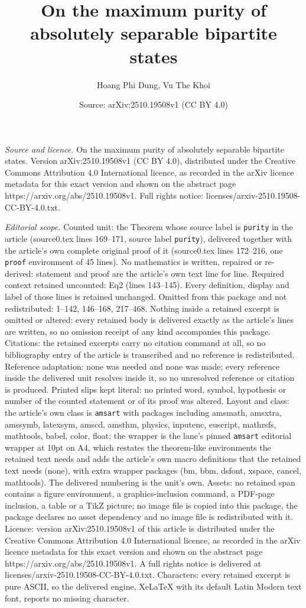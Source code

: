 \documentclass[10pt,a4paper]{amsart}
\title[On the maximum purity of absolutely separable bipartite stat]{On the maximum purity of absolutely separable bipartite states}
\author{Hoang Phi Dung, Vu The Khoi}
\date{Source: arXiv:2510.19508v1 (CC BY 4.0)}
\begin{document}
\maketitle

\noindent\emph{Source and licence.} On the maximum purity of absolutely separable bipartite states. Version arXiv:2510.19508v1 (CC BY 4.0), distributed under the Creative Commons Attribution 4.0 International licence, as recorded in the arXiv licence metadata for this exact version and shown on the abstract page https://arxiv.org/abs/2510.19508v1. Full rights notice: licenses/arxiv-2510.19508-CC-BY-4.0.txt.\par\smallskip

\noindent\textit{Editorial scope.} Counted unit: the Theorem whose source label is \texttt{purity} in the article (source0.tex lines 169--171, source label \texttt{purity}), delivered together with the article's own complete original proof of it (source0.tex lines 172--216, one \texttt{proof} environment of 45 lines). No mathematics is written, repaired or re-derived: statement and proof are the article's own text line for line. Required context retained uncounted: Eq2 (lines 143--145). Every definition, display and label of those lines is retained unchanged. Omitted from this package and not redistributed: 1--142, 146--168, 217--468. Nothing inside a retained excerpt is omitted or altered: every retained body is delivered exactly as the article's lines are written, so no omission receipt of any kind accompanies this package. Citations: the retained excerpts carry no citation command at all, so no bibliography entry of the article is transcribed and no reference is redistributed. Reference adaptation: none was needed and none was made; every reference inside the delivered unit resolves inside it, so no unresolved reference or citation is produced. Printed slips kept literal: no printed word, symbol, hypothesis or number of the counted statement or of its proof was altered. Layout and class: the article's own class is \texttt{amsart} with packages including amsmath, amsxtra, amssymb, latexsym, amscd, amsthm, physics, inputenc, euscript, mathrsfs, mathtools, babel, color, float; the wrapper is the lane's pinned \texttt{amsart} editorial wrapper at 10pt on A4, which restates the theorem-like environments the retained text needs and adds the article's own macro definitions that the retained text needs (none), with extra wrapper packages (bm, bbm, dsfont, xspace, cancel, mathtools). The delivered numbering is the unit's own. Assets: no retained span contains a figure environment, a graphics-inclusion command, a PDF-page inclusion, a table or a TikZ picture; no image file is copied into this package, the package declares no asset dependency and no image file is redistributed with it. Licence: version arXiv:2510.19508v1 of this article is distributed under the Creative Commons Attribution 4.0 International licence, as recorded in the arXiv licence metadata for this exact version and shown on the abstract page https://arxiv.org/abs/2510.19508v1. A full rights notice is delivered at licenses/arxiv-2510.19508-CC-BY-4.0.txt. Characters: every retained excerpt is pure ASCII, so the delivered engine, XeLaTeX with its default Latin Modern text font, reports no missing character.
\end{document}
